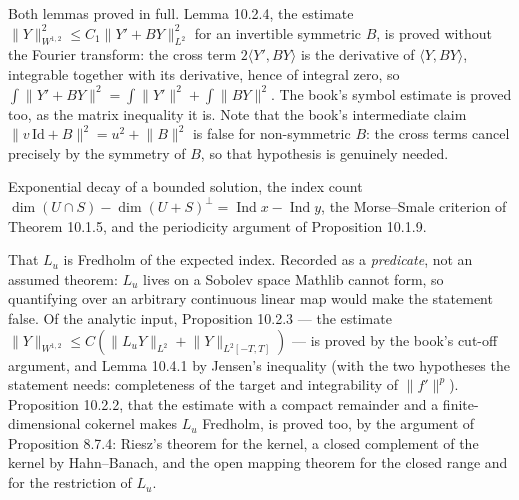 \begin{lemma}
  \label{lem:10.2.4}
  \leanok
  Both lemmas proved in full.  Lemma 10.2.4, the estimate
  $\lVert Y\rVert_{W^{1,2}}^2 \le C_1 \lVert Y' + BY\rVert_{L^2}^2$ for an invertible
  symmetric $B$, is proved without the Fourier transform: the cross term
  $2\langle Y', BY\rangle$ is the derivative of $\langle Y, BY\rangle$, integrable
  together with its derivative, hence of integral zero, so
  $\int \lVert Y'+BY\rVert^2 = \int \lVert Y'\rVert^2 + \int \lVert BY\rVert^2$.  The
  book's symbol estimate is proved too, as the matrix inequality it is.  Note
  that the book's intermediate claim $\lVert v\,\mathrm{Id} + B\rVert^2 =
  u^2 + \lVert B\rVert^2$ is false for non-symmetric $B$: the cross terms cancel
  precisely by the symmetry of $B$, so that hypothesis is genuinely needed.
\end{lemma}

\begin{proposition}[\S10.2.b--10.2.e]
  \label{prop:10.2}
  \leanok
  Exponential decay of a bounded solution, the index count
  $\dim(U\cap S) - \dim(U+S)^\perp = \operatorname{Ind}x - \operatorname{Ind}y$,
  the Morse--Smale criterion of Theorem 10.1.5, and the periodicity argument of
  Proposition 10.1.9.
\end{proposition}

\begin{theorem}
  \label{thm:10.1.3}
  \notready
  That $L_u$ is Fredholm of the expected index.  Recorded as a \emph{predicate},
  not an assumed theorem: $L_u$ lives on a Sobolev space Mathlib cannot form, so
  quantifying over an arbitrary continuous linear map would make the statement
  false.  Of the analytic input, Proposition 10.2.3 --- the estimate
  $\lVert Y\rVert_{W^{1,2}} \le C(\lVert L_uY\rVert_{L^2} + \lVert Y\rVert_{L^2[-T,T]})$
  --- is proved by the book's cut-off argument, and Lemma 10.4.1 by Jensen's
  inequality (with the two hypotheses the statement needs: completeness of the
  target and integrability of $\lVert f'\rVert^p$).  Proposition 10.2.2, that the
  estimate with a compact remainder and a finite-dimensional cokernel makes $L_u$
  Fredholm, is proved too, by the argument of Proposition 8.7.4: Riesz's theorem
  for the kernel, a closed complement of the kernel by Hahn--Banach, and the open
  mapping theorem for the closed range and for the restriction of $L_u$.
\end{theorem}

